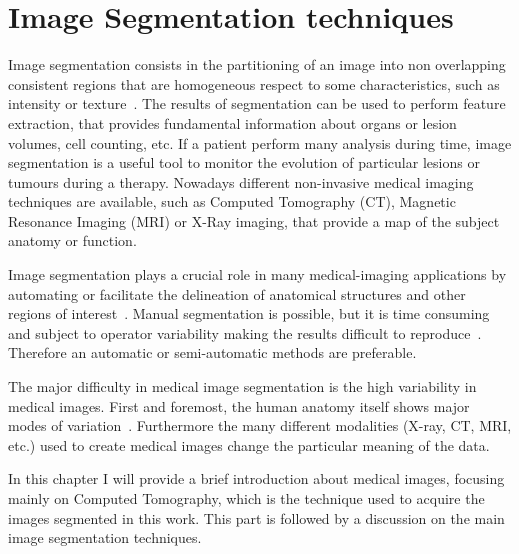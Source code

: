 \documentclass{standalone}
\begin{document}
	\chapter{Image Segmentation techniques}
	Image segmentation consists in the partitioning of an image into non overlapping consistent regions that are homogeneous respect to some characteristics, such as intensity or texture~\cite{ART:Pham}.
	The results of segmentation can be used to perform feature extraction, that provides fundamental information about organs or lesion volumes, cell counting, etc. If a patient perform many analysis during time, image segmentation is a useful tool to monitor the evolution of particular lesions or tumours during a therapy.
	Nowadays different non-invasive medical imaging techniques are available, such as Computed Tomography (CT), Magnetic Resonance Imaging (MRI) or X-Ray imaging, that provide a map of the subject anatomy or function. 
	
	Image segmentation plays a crucial role in many medical-imaging applications by automating or facilitate the delineation of anatomical structures and other regions of interest~\cite{ART:Pham}.  Manual segmentation is  possible, but it is time consuming and subject to operator variability making the results difficult to reproduce~\cite{INP:Withey}. Therefore an automatic or semi-automatic methods are preferable. 
	
	The major difficulty in medical image segmentation is the high variability in medical images. First and foremost, the human anatomy itself shows major modes of variation~\cite{ART:Pooja}. Furthermore the many different modalities (X-ray, CT, MRI, etc.) used to create medical images change the particular meaning of the data.
	
	In this chapter I will provide a brief introduction about medical images, focusing mainly on Computed Tomography, which is the technique used to acquire the images segmented in this work. 	
	This part is followed by a discussion on the main image segmentation techniques.
	
\end{document}
